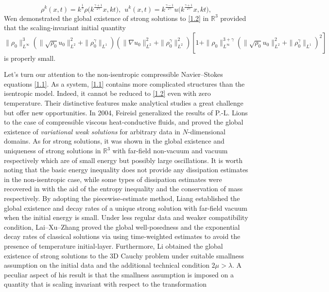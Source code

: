 \documentclass[11pt]{article}
\begin{document}
$$
\rho^k (x,t) = k^{\frac{1}{\gamma}} \rho\Big(k^{\frac{\gamma + 1}{2 \gamma}} x, k t\Big), \ \ u^k (x,t) = k^{\frac{\gamma - 1}{2 \gamma}} u\Big(k^{\frac{\gamma + 1}{2 \gamma}} x, k t\Big),
$$
Wen \cite{W2025} demonstrated the global existence of strong solutions to \eqref{1.2} in $\mathbb{R}^3$ provided that the scaling-invariant initial quantity
\begin{equation}\label{1.3}
\|\rho_0\|_{L^{\infty }}^3 \left( \|\sqrt{\rho_0} u_0\|_{L^2}^2 + \|\rho_0^{\gamma}\|_{L^1} \right) \left(\|\nabla u_0\|_{L^2}^2 + \|\rho_0^{\gamma}\|_{L^2}^2 \right)\left[1 + \|\rho_0\|_{L^{\infty }}^{3 + \gamma} \left( \|\sqrt{\rho_0} u_0\|_{L^2}^2 + \|\rho_0^{\gamma}\|_{L^1} \right)^2 \right]
\end{equation}
is properly small.

Let's turn our attention to the non-isentropic compressible Navier--Stokes equations \eqref{1.1}. As a system, \eqref{1.1} contains more complicated structures than the isentropic model. Indeed, it cannot be reduced to \eqref{1.2} even with zero temperature. Their distinctive features make analytical studies a great challenge but offer new opportunities. In 2004, Feireisl \cite{Fe2004} generalized the results of P.-L. Lions \cite{Li1998} to the case of compressible viscous heat-conductive fluids, and proved the global existence of {\it variational weak solutions} for arbitrary data in $N$-dimensional domains. As for strong solutions, it was shown in \cite{HL2018,WZ2017} the global existence and uniqueness of strong solutions in $\mathbb{R}^3$ with far-field non-vacuum and vacuum respectively which are of small energy but possibly large oscillations. It is worth noting that the basic energy inequality does not provide any dissipation estimates in the non-isentropic case, while some types of dissipation estimates were recovered in \cite{HL2018,WZ2017} with the aid of the entropy inequality and the conservation of mass respectively. By adopting the piecewise-estimate
method, Liang \cite{L21} established the global existence and decay rates of a unique strong solution with far-field vacuum when the initial energy is small. Under less regular data and weaker compatibility condition, Lai--Xu--Zhang \cite{LXZ2022} proved the global well-posedness and the exponential decay rates of classical solutions via using time-weighted estimates to avoid the presence of temperature initial-layer. Furthermore, Li \cite{Li2020} obtained the global existence of strong solutions to the 3D Cauchy problem under suitable smallness assumption on the initial data and the additional technical condition $2\mu>\lambda$. A peculiar aspect of his result is that the smallness assumption is imposed on a quantity that is scaling invariant with respect to the transformation
\end{document}
